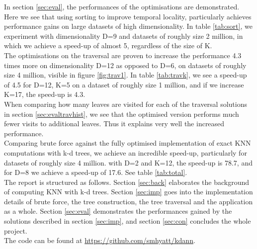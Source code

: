 







\noindent In section \ref{sec:eval}, the performances of the optimisations are demonstrated. Here we see that using sorting to improve temporal locality, particularly achieves performance gains on large datasets of high dimensionality. In table \ref{tab:sort}, we experiment with dimensionality D=9 and datasets of roughly size 2 million, in which we achieve a speed-up of almost 5, regardless of the size of K.  
\\[2mm]
The optimisations on the traversal are proven to increase the performance 4.3 times more on dimensionality D=12 as opposed to D=6, on datasets of roughly size 4 million, visible in figure \ref{fig:trav1}. In table \ref{tab:travk}, we see a speed-up of 4.5 for D=12, K=5 on a dataset of roughly size 1 million, and if we increase K=17, the speed-up is 4.3. 
\\[2mm]
When comparing how many leaves are visited for each of the traversal solutions in section \ref{sec:evaltravhist}, we see that the optimised version performs much fewer visits to additional leaves. Thus it explains very well the increased performance. 
\\[2mm]
Comparing brute force against the fully optimised implementation of exact KNN computations with k-d trees, we achieve an incredible speed-up, particularly for datasets of roughly size 4 million. with D=2 and K=12, the speed-up is 78.7, and for D=8 we achieve a speed-up of 17.6. See table \ref{tab:total}.
\\[2mm]
The report is structured as follows. Section \ref{sec:back} elaborates the background of computing KNN with k-d trees. Section \ref{sec:imp} goes into the implementation details of brute force, the tree construction, the tree traversal and the application as a whole. Section \ref{sec:eval} demonstrates the performances gained by the solutions described in section \ref{sec:imp}, and section \ref{sec:con} concludes the whole project. 
\\[2mm]
The code can be found at \url{https://github.com/smhyatt/kdann}. 

